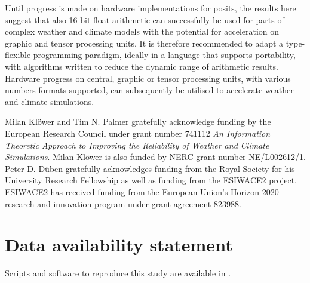 \documentclass[draft]{agujournal2019}
\begin{document}
Until progress is made on hardware implementations for posits, the results here
suggest that also 16-bit float arithmetic can successfully be used for parts of
complex weather and climate models with the potential for acceleration on graphic
and tensor processing units. It is therefore recommended to adapt a type-flexible
programming paradigm, ideally in a language that supports portability, with
algorithms written to reduce the dynamic range of arithmetic results. Hardware
progress on central, graphic or tensor processing units, with various numbers
formats supported, can subsequently be utilised to accelerate weather and
climate simulations.

\acknowledgments
Milan Kl\"{o}wer and Tim N. Palmer gratefully acknowledge funding by the European
Research Council under grant number 741112 \emph{An Information Theoretic Approach
to Improving the Reliability of Weather and Climate Simulations}. Milan Kl\"{o}wer
is also funded by NERC grant number NE/L002612/1.  Peter D. D\"{u}ben gratefully
acknowledges funding from the Royal Society for his University Research Fellowship
as well as funding from the ESIWACE2 project. ESIWACE2 has received funding from
the European Union's Horizon 2020 research and innovation program under grant
agreement 823988.

\section*{Data availability statement}
Scripts and software to reproduce this study are available in .


\end{document}
